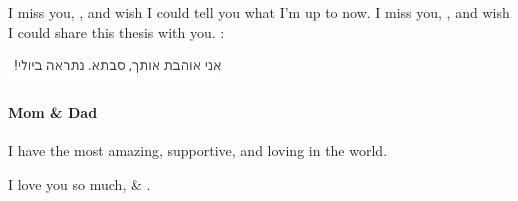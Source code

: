I miss you, , and wish I could tell you what I'm up to now.
I miss you, , and wish I could share this thesis with you.
:

\begin{flushright}
\includegraphics[height=6mm]{savta.png}
\end{flushright}

\paragraph{Mom \& Dad}

I have the most amazing, supportive, and loving  in the world.

I love you so much,  \& .

